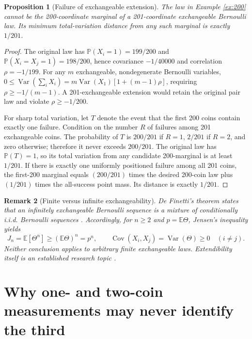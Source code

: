 \documentclass[11pt,a4paper]{article}
\newtheorem{proposition}{Proposition}
\newtheorem{remark}[proposition]{Remark}
\newcommand{\PP}{\mathbb{P}}
\newcommand{\EE}{\mathbb{E}}
\newcommand{\Cov}{\operatorname{Cov}}
\newcommand{\Var}{\operatorname{Var}}
\begin{document}
\begin{proposition}[Failure of exchangeable extension]\label{prop:extension}
The law in Example \ref{ex:200} cannot be the 200-coordinate marginal of a 201-coordinate \emph{exchangeable} Bernoulli law. Its minimum total-variation distance from any such marginal is exactly $1/201$.
\end{proposition}
\begin{proof}
The original law has $\PP(X_i=1)=199/200$ and $\PP(X_i=X_j=1)=198/200$, hence covariance $-1/40000$ and correlation $\rho=-1/199$. For any $m$ exchangeable, nondegenerate Bernoulli variables, $0\leq\Var(\sum_iX_i)=m\Var(X_1)[1+(m-1)\rho]$, requiring $\rho\geq-1/(m-1)$. A 201-exchangeable extension would retain the original pair law and violate $\rho\geq-1/200$.

For sharp total variation, let $T$ denote the event that the first 200 coins contain exactly one failure. Condition on the number $R$ of failures among 201 exchangeable coins. The probability of $T$ is $200/201$ if $R=1$, $2/201$ if $R=2$, and zero otherwise; therefore it never exceeds $200/201$. The original law has $\PP(T)=1$, so its total variation from any candidate 200-marginal is at least $1/201$. If there is exactly one uniformly positioned failure among all 201 coins, the first-200 marginal equals $(200/201)$ times the desired 200-coin law plus $(1/201)$ times the all-success point mass. Its distance is exactly $1/201$.
\end{proof}

\begin{remark}[Finite versus infinite exchangeability]
De Finetti's theorem states that an \emph{infinitely} exchangeable Bernoulli sequence is a mixture of conditionally i.i.d. Bernoulli sequences \cite{kirsch}. Accordingly, for $n\ge2$ and $p=\EE\Theta$, Jensen's inequality yields
\begin{equation}\label{eq:jensen}
J_n=\EE[\Theta^n]\ge (\EE\Theta)^n=p^n,\qquad
\Cov(X_i,X_j)=\Var(\Theta)\ge0\quad(i\ne j).
\end{equation}
Neither conclusion applies to arbitrary \emph{finite} exchangeable laws. Extendibility itself is an established research topic \cite{konstantopoulos}.
\end{remark}

\section{Why one- and two-coin measurements may never identify the third}\label{sec:ident}
\end{document}
